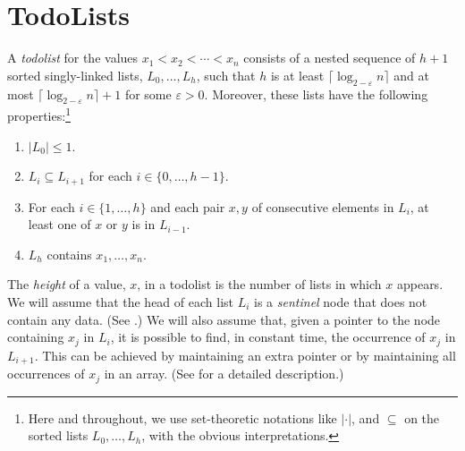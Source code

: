 \documentclass{patmorin}
\begin{document}
\section{TodoLists}

A \emph{todolist} for the values $x_1<x_2<\cdots<x_n$ consists of a
nested sequence of $h+1$ sorted singly-linked lists, $L_0,\ldots,L_h$,
such that $h$ is at least $\lceil \log_{2-\varepsilon} n\rceil$ and at
most $\lceil \log_{2-\varepsilon} n\rceil+1$ for some $\varepsilon >0$.
Moreover, these lists have the following properties:\footnote{Here and
throughout, we use set-theoretic notations like $|\cdot|$, and $\subseteq$
on the sorted lists $L_0,\ldots,L_h$, with the obvious interpretations.}

\begin{enumerate}
\setlength{\itemsep}{0mm}
  \item $|L_0| \le 1$. 
  \item $L_i\subseteq L_{i+1}$ for each $i\in\{0,\ldots,h-1\}$.
  \item For each $i\in\{1,\ldots,h\}$ and each pair $x,y$ of consecutive
        elements in $L_i$, at least one of $x$ or $y$ is in $L_{i-1}$.
  \item $L_h$ contains $x_1,\ldots,x_n$.
\end{enumerate}

The \emph{height} of
a value, $x$, in a todolist is the number of lists in which $x$ appears.
We will assume that the head of each list $L_i$ is a \emph{sentinel} node that does not contain any data. (See .)  We will also
assume that, given a pointer to the node containing $x_j$ in $L_i$, it is
possible to find, in constant time, the occurrence of $x_j$ in $L_{i+1}$.
This can be achieved by maintaining an extra pointer or by maintaining
all occurrences of $x_j$ in an array. (See  for
a detailed description.)
\end{document}

